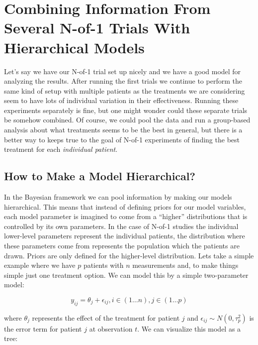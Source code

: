 \documentclass[12pt,a4paper,leqno]{report}
\theoremstyle{plain}
\theoremstyle{definition}
\theoremstyle{remark}
\begin{document}
\chapter{Combining Information From Several N-of-1 Trials With Hierarchical
  Models}\label{hierarchicalbayes}

Let's say we have our N-of-1 trial set up nicely and we have a good model for analyzing the
results. After running the first trials we continue to perform the same kind of setup
with multiple patients as the treatments we are considering seem to have lots of
individual variation in their effectiveness. Running these experiments separately is
fine, but one might wonder could these separate trials be somehow combined. Of course, we could pool the data and run a group-based
analysis about what treatments seems to be the best in general, but there is a better
way to keeps true to the goal of N-of-1 experiments of finding the best treatment for
each \emph{individual patient}.

\section{How to Make a Model Hierarchical?}

In the Bayesian framework we can pool information by making our models hierarchical.
This means that instead of defining priors for our model variables, each model parameter is imagined to come from a ``higher'' distributions
that is controlled by its own parameters. In the case of N-of-1 studies the individual lower-level parameters represent the
individual patients, the distribution where these parameters come from represents
the population which the patients are drawn. Priors are only defined for the higher-level distribution. Lets take a simple example where we have $p$ patients with $n$
measurements and, to make things simple just one treatment option. We can model this by
a simple two-parameter model:

\begin{def}\label{}
    \begin{equation}\label{simplehierachical}
        y_{ij} = \theta_j + \epsilon_{ij}, i\in(1 \dots n), j\in(1 \dots p)
    \end{equation}
\end{def}where $\theta_j$ represents the effect of the treatment for patient $j$ and
\(\epsilon_{ij} \sim N(0,\tau_p^2)\) is the error term for patient $j$ at observation
$t$. We can visualize this model as a tree:
\end{document}
